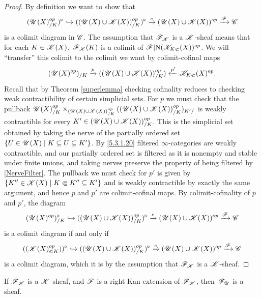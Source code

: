 \documentclass[../../thesis.tex]{subfiles}
\begin{document}
\begin{proof}
    By definition we want to show that
    \[
        (\mathscr{U}(X)_{/K}^{op})^{\triangleright} \hookrightarrow ((\mathscr{U}(X)\cup \mathscr{K}(X))_{/K}^{op})^{\triangleright} \xrightarrow{c}(\mathscr{U}(X) \cup \mathscr{K}(X))^{op}\xrightarrow{\mathscr{F}}\mathscr{C}
    \]
    is a colimit diagram in $\mathscr{C}$.
    The assumption that $\mathscr{F}_{\mathscr{K}}$ is a $\mathscr{K}$-sheaf means that for each $K\in \mathscr{K}(X)$, $\mathscr{F}_{\mathscr{K}}(K)$ is a colimit of $\mathscr{F}|\mathrm{N}(\mathscr{K}_{K\Subset}(X))^{op}$.
    We will ``transfer'' this colimit to the colimit we want by colimit-cofinal maps
    \[
        (\mathscr{U}(X)^{op})_{/K} \xrightarrow{p} ((\mathscr{U}(X)\cup \mathscr{K}(X))_{/K}^{op}) \xleftarrow{p'}\mathscr{K}_{K\Subset}(X)^{op}.
    \]
    Recall that by Theorem \ref{superlemma} checking cofinality reduces to checking weak contractibility of certain simplicial sets.
    For $p$ we must check that the pullback $\mathscr{U}(X)^{op}_{/K} \times_{(\mathscr{U}(X)\cup \mathscr{K}(X))_{/K}^{op}} ((\mathscr{U}(X)\cup \mathscr{K}(X))_{/K}^{op})_{K'/}$ is weakly contractible for every $K' \in (\mathscr{U}(X)\cup \mathscr{K}(X))_{/K}^{op}$.
    This is the simplicial set obtained by taking the nerve of the partially ordered set $\{U \in \mathscr{U}(X) \mid K\subseteq U \subseteq K'\}$.
    By \ref{5.3.1.20} filtered $\infty$-categories are weakly contractible, and our partially ordered set is filtered as it is nonempty and stable under finite unions, and taking nerves preserve the property of being filtered by \ref{NerveFilter}.
    The pullback we must check for $p'$ is given by $\{K'' \in \mathscr{K}(X) \mid K \Subset K'' \subseteq K'\}$ and is weakly contractible by exactly the same argument, and hence $p$ and $p'$ are colimit-cofinal maps.
    By colimit-cofinality of $p$ and $p'$, the diagram
    \[
        (\mathscr{U}(X)^{op})^{\triangleright}_{/K} \hookrightarrow ((\mathscr{U}(X)\cup \mathscr{K}(X))_{/K}^{op})^{\triangleright} \xrightarrow{c}(\mathscr{U}(X) \cup \mathscr{K}(X))^{op}\xrightarrow{\mathscr{F}}\mathscr{C}
    \]
    is a colimit diagram if and only if
    \[
        ((\mathscr{K}(X)^{op}_{\Subset K}))^{\triangleright} \hookrightarrow ((\mathscr{U}(X)\cup \mathscr{K}(X))_{/K}^{op})^{\triangleright} \xrightarrow{c}(\mathscr{U}(X) \cup \mathscr{K}(X))^{op}\xrightarrow{\mathscr{F}}\mathscr{C}
    \]
    is a colimit diagram, which it is by the assumption that $\mathscr{F}_{\mathscr{K}}$ is a $\mathscr{K}$-sheaf.
\end{proof}
\begin{lemma}
    If $\mathscr{F}_{\mathscr{K}}$ is a $\mathscr{K}$-sheaf, and $\mathscr{F}$ is a right Kan extension of $\mathscr{F}_{\mathscr{K}}$, then $\mathscr{F}_{\mathscr{U}}$ is a sheaf.
\end{lemma}
\end{document}
